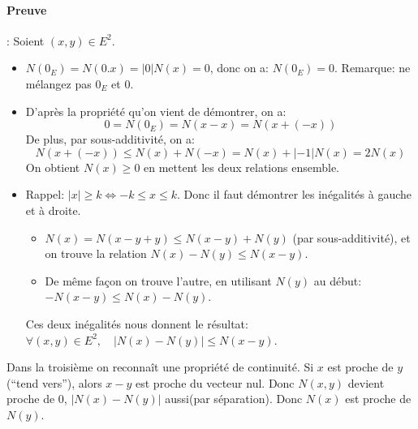 \documentclass{article}
\begin{document}
\paragraph{Preuve}: Soient $(x, y) \in E^2$.
\begin{itemize}
 \item $N(0_{E}) = N(0.x) = |0| N(x) = 0$, donc on a: \underline{$N(0_E) = 0$}.
          \newline Remarque: ne mélangez pas $0_E$ et $0$.
 \item D'après la propriété qu'on vient de démontrer, on a:
          \[
          0 = N(0_{E}) = N(x-x) = N(x+(-x)) 
          \]
          De plus, par sous-additivité, on a: 
          \[
          N(x+(-x)) \leq N(x) + N(-x) = N(x) + |-1|N(x) = 2N(x)
          \]
          On obtient \underline{$N(x) \geq 0$} en mettent les deux relations ensemble.
 \item Rappel: $|x| \geq k \Longleftrightarrow -k \leq x \leq k$. 
          \newline Donc il faut démontrer les inégalités à gauche et à droite.
          \begin{itemize}
          \item $N(x) = N(x - y + y) \leq N(x - y) + N(y)$ (par sous-additivité), et on trouve la relation $N(x) - N(y) \leq N(x-y)$.
          \item De même fa\c con on trouve l'autre, en utilisant $N(y)$ au début: $-N(x-y) \leq N(x) - N(y)$.
          \end{itemize}
          Ces deux inégalités nous donnent le résultat: $\forall (x,y) \in E^2, \quad |N(x) - N(y)| \leq N(x - y)$.
 
 
\end{itemize}

\begin{tcolorbox}[colback=yellow!5!white,colframe=yellow!75!black,title=Remarque 1.1]

Dans la troisième on reconnaît une propriété de continuité. Si $x$ est proche de $y$ (``tend vers''), alors $x-y$ est proche du vecteur nul. Donc $N(x,y)$ devient proche de 0, $|N(x)-N(y)|$ aussi(par séparation). Donc $N(x)$  est proche de $N(y)$.



\end{tcolorbox}
\end{document}
